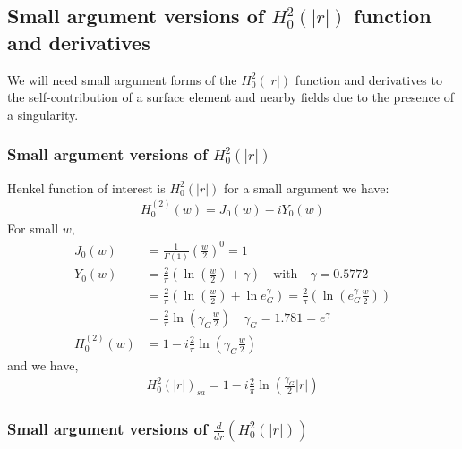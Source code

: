\documentclass{article}
\newcommand{\0}{\varnothing}
\begin{document}
\newpage
\subsection{Small argument versions of $H_0^2(|r|)$ function and derivatives}

We will need small argument forms of the $H_0^2(|r|)$ function and derivatives to the self-contribution of a surface element and nearby fields due to the presence of a singularity. 

\subsubsection{Small argument versions of $H_0^2(|r|)$}

Henkel function of interest is $H_0^2(|r|)$ for a small argument we have:
\begin{align*}
    H_0^{(2)}(w) = J_0(w) - i Y_0(w) 
\end{align*}
For small $w$,
\begin{align*}
    J_0(w) &= \frac{1}{\Gamma(1)} \left(\frac{w}{2}\right)^0 = 1\\
    Y_0(w) &= \frac{2}{\pi} \left(\ln \left( \frac{w}{2}\right) + \gamma\right) \quad \text{with} \quad \gamma = 0.5772\\
           &= \frac{2}{\pi} \left(\ln \left( \frac{w}{2}\right) + \ln e^\gamma_G \right) = \frac{2}{\pi} \left(\ln \left( e^\gamma_G \frac{w}{2}\right) \right) \\
           &= \frac{2}{\pi} \ln \left( \gamma_G \frac{w}{2} \right) \quad \gamma_G = 1.781 = e^\gamma\\
    H_0^{(2)}(w) &= 1 - i \frac{2}{\pi} \ln \left( \gamma_G \frac{w}{2} \right)
\end{align*}
and we have,
\begin{align*}
	H_0^2(|r|)_{sa} = 1 - i \frac{2}{\pi} \ln \left(\frac{\gamma_G}{2} |r| \right)
\end{align*}

\subsubsection{Small argument versions of $\frac{d}{dr}(H_0^2(|r|))$}
\end{document}
